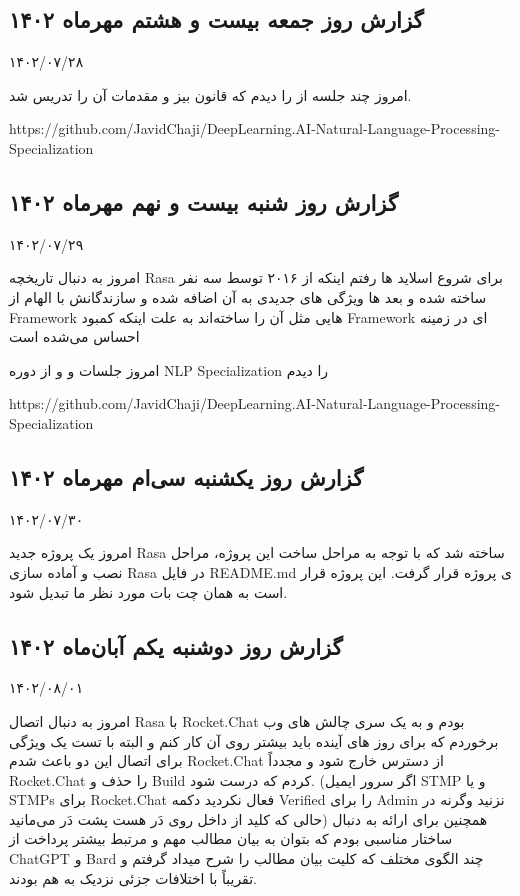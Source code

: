 \subsection{گزارش روز جمعه بیست و هشتم مهرماه ۱۴۰۲}

۱۴۰۲/۰۷/۲۸

امروز چند جلسه از  را دیدم که قانون بیز و مقدمات آن را تدریس شد.

https://github.com/JavidChaji/DeepLearning.AI-Natural-Language-Processing-Specialization


\subsection{گزارش روز شنبه بیست و نهم مهرماه ۱۴۰۲}

۱۴۰۲/۰۷/۲۹

امروز به دنبال تاریخچه Rasa برای شروع اسلاید ها رفتم اینکه از ۲۰۱۶ توسط سه نفر ساخته شده و بعد ها ویژگی های جدیدی به آن اضافه شده و سازندگانش با الهام از Framework هایی مثل  آن را ساخته‌اند به علت اینکه کمبود Framework ای در زمینه  احساس می‌شده است

امروز جلسات  و  و   
از دوره NLP Specialization را دیدم

https://github.com/JavidChaji/DeepLearning.AI-Natural-Language-Processing-Specialization


\subsection{گزارش روز یکشنبه سی‌ام مهرماه ۱۴۰۲}

۱۴۰۲/۰۷/۳۰

امروز یک پروژه جدید Rasa ساخته شد که با توجه به مراحل ساخت این پروژه، مراحل نصب و آماده سازی Rasa در فایل README.md ی پروژه قرار گرفت. این پروژه قرار است به همان چت بات مورد نظر ما تبدیل شود.


\subsection{گزارش روز دوشنبه یکم آبان‌ماه ۱۴۰۲}

۱۴۰۲/۰۸/۰۱

امروز به دنبال اتصال Rasa با Rocket.Chat بودم و به یک سری چالش های وب برخوردم که برای روز های آینده باید بیشتر روی آن کار کنم و البته با تست یک ویژگی برای اتصال این دو باعث شدم Rocket.Chat از دسترس خارج شود و مجدداً Rocket.Chat را حذف و Build کردم که درست شود. (اگر سرور ایمیل STMP و یا STMPs برای Rocket.Chat فعال نکردید دکمه Verified را برای Admin نزنید وگرنه در حالی که کلید از داخل روی دَر هست پشت دَر می‌مانید)
همچنین برای ارائه به دنبال ساختار مناسبی بودم که بتوان به بیان مطالب مهم و مرتبط بیشتر پرداخت از ChatGPT و Bard چند الگوی مختلف که کلیت بیان مطالب را شرح میداد گرفتم و تقریباً با اختلافات جزئی نزدیک به هم بودند.


